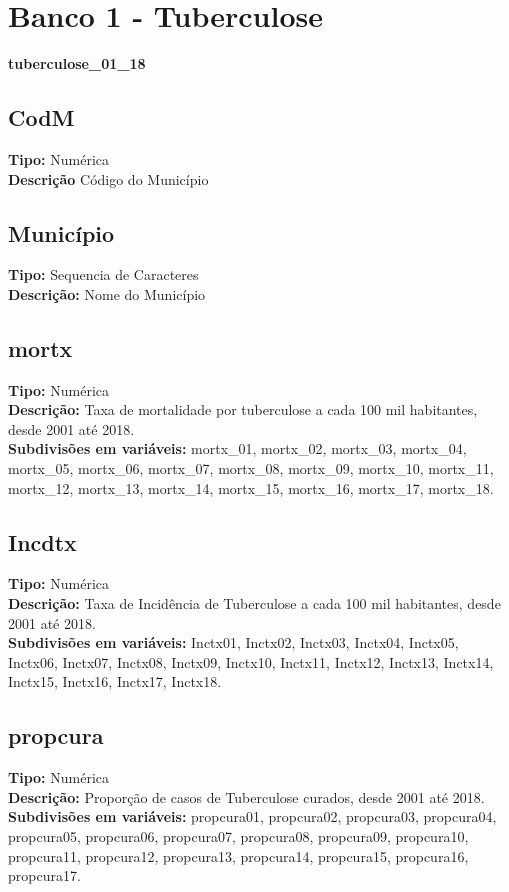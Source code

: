 \documentclass[12pt]{article}
\begin{document}
	\section{Banco 1 - Tuberculose}
		{\bf tuberculose\_01\_18}
		\subsection{CodM}
		{\bf Tipo:} Numérica \\
		{\bf Descrição} Código do Município \\
		\subsection{Município}
		{\bf Tipo:} Sequencia de Caracteres \\
		{\bf Descrição:} Nome do Município 
		\subsection{mortx}
		{\bf Tipo:} Numérica \\
		{\bf Descrição:} Taxa de mortalidade por tuberculose a cada 100 mil habitantes, desde 2001 até 2018.\\
		{\bf Subdivisões em variáveis:} mortx\_01,  mortx\_02, mortx\_03, mortx\_04, mortx\_05, mortx\_06, mortx\_07, mortx\_08, mortx\_09,
		 mortx\_10, mortx\_11, mortx\_12, mortx\_13, mortx\_14, mortx\_15, mortx\_16, mortx\_17, mortx\_18. \\
		\subsection{Incdtx}
		{\bf Tipo:} Numérica \\
		{\bf Descrição:} Taxa de Incidência de Tuberculose a cada 100 mil habitantes, desde 2001 até 2018.\\
		{\bf Subdivisões em variáveis:} Inctx01, Inctx02, Inctx03, Inctx04, Inctx05, Inctx06, Inctx07, 
		Inctx08, Inctx09, Inctx10, Inctx11, Inctx12, Inctx13, Inctx14, Inctx15, Inctx16, Inctx17, Inctx18.
		\subsection{propcura}
		{\bf Tipo:} Numérica \\
		{\bf Descrição:} Proporção de casos de Tuberculose curados, desde 2001 até 2018.\\
		{\bf Subdivisões em variáveis:} propcura01, propcura02, propcura03, propcura04, propcura05, propcura06, propcura07,
		propcura08, propcura09, propcura10, propcura11, propcura12, propcura13, propcura14, propcura15, propcura16,
		propcura17.
\end{document}
